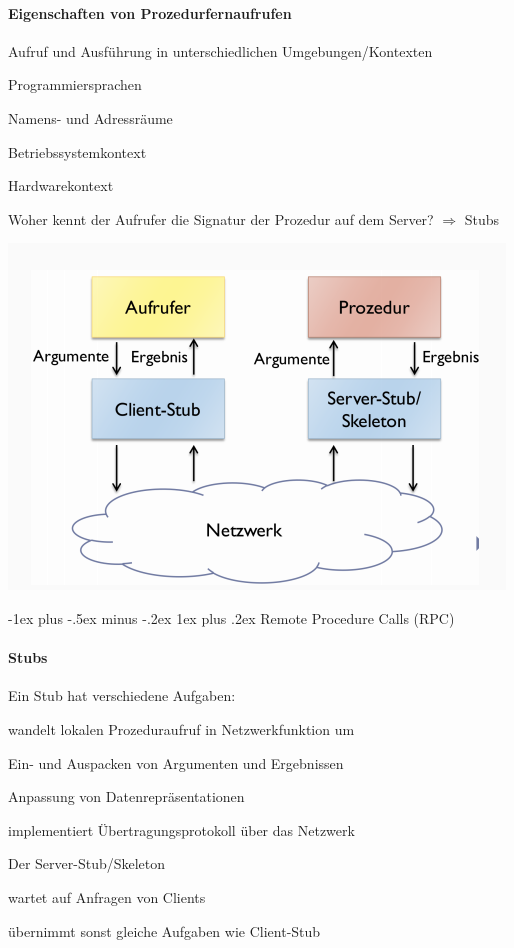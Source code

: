 \documentclass[10pt]{article}
\makeatletter
\renewcommand{\subsubsection}{\@startsection{subsubsection}{3}{0mm}%
                                {-1ex plus -.5ex minus -.2ex}%
                                {1ex plus .2ex}%
                                {\normalfont\small\bfseries}}
\makeatother
\begin{document}
  \paragraph{Eigenschaften von Prozedurfernaufrufen}
  
  Aufruf und Ausführung in unterschiedlichen Umgebungen/Kontexten
  \begin{itemize*}
    \item Programmiersprachen
    \item Namens- und Adressräume
    \item Betriebssystemkontext
    \item Hardwarekontext
  \end{itemize*}
  Woher kennt der Aufrufer die Signatur der Prozedur auf dem Server? $\Rightarrow$ \color{orange} Stubs \color{black}
\begin{center}
  \includegraphics[width=0.4\linewidth]{Assets/Programmierparadigmen-netzwerk-stubs}
\end{center}

\subsubsection{Remote Procedure Calls (RPC)}
\paragraph{Stubs}

Ein Stub hat verschiedene Aufgaben: 
\begin{itemize*}
  \item wandelt lokalen Prozeduraufruf in Netzwerkfunktion um
  \item Ein- und Auspacken von Argumenten und Ergebnissen
  \item Anpassung von Datenrepräsentationen
  \item implementiert Übertragungsprotokoll über das Netzwerk
\end{itemize*}
Der Server-Stub/Skeleton
\begin{itemize*}
  \item wartet auf Anfragen  von Clients
  \item übernimmt sonst gleiche Aufgaben wie Client-Stub
\end{itemize*}
\end{document}
